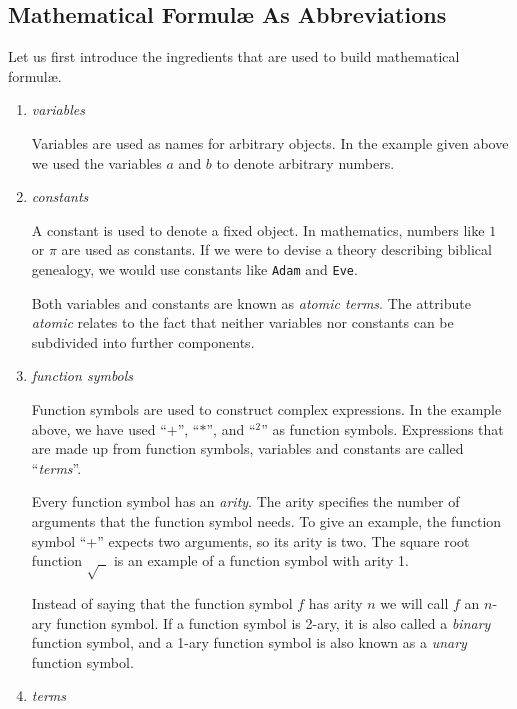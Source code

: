 \subsection{Mathematical {Formul\ae} As Abbreviations}
Let us first introduce the ingredients that are used to build mathematical {formul\ae}.
\begin{enumerate}
\item \emph{variables}

      Variables are used as names for arbitrary objects.  In the example given above we
      used the variables $a$ and $b$ to denote arbitrary numbers.
\item \emph{constants}

      A constant is used to denote a fixed object.  In mathematics, numbers like $1$ or
      $\pi$ are used as constants.  If we were to devise a theory describing biblical
      genealogy, we would use constants like \texttt{Adam} and \texttt{Eve}.

      Both variables and constants are known as \emph{atomic terms}.  The attribute
      \emph{atomic} relates to the fact that neither variables nor constants can be
      subdivided into further components.  

\item \emph{function symbols}

      Function symbols are used to construct complex expressions.  In the example above, we
      have used ``$+$'', ``$*$'', and ``$^2$'' as function symbols.  Expressions that are
      made up from function symbols, variables and constants are called ``\emph{terms}''.

      Every function symbol has an \emph{arity}.  The arity specifies the number of
      arguments that the function symbol needs.  To give an example, the function symbol
      ``+'' expects two arguments, so its arity is two.  The square root function
      $\sqrt{\;\;}$ is an example of a function symbol with arity 1.
      
      Instead of saying that the function symbol $f$ has arity $n$ we will call $f$ an
      $n$-ary function symbol.  If a function symbol is 2-ary, it is also called a
      \emph{binary} function symbol, and a 1-ary function symbol is also known as a
      \emph{unary} function symbol.  
\item \emph{terms}


\end{enumerate}
